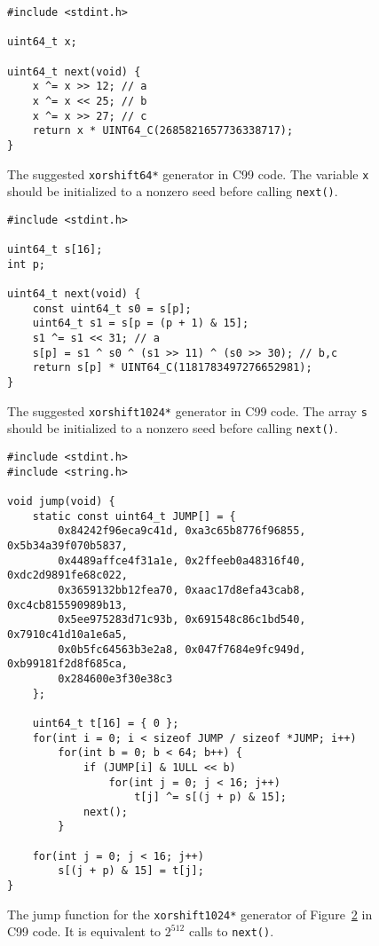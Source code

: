 \documentclass{acmsmalltr}
\newcommand{\xorshifts}[1][]{\texttt{xorshift#1*}\xspace}
\begin{document}
\begin{figure}[ht]
\centering
\begin{verbatim}
#include <stdint.h>

uint64_t x;

uint64_t next(void) {
    x ^= x >> 12; // a
    x ^= x << 25; // b
    x ^= x >> 27; // c
    return x * UINT64_C(2685821657736338717);
}
\end{verbatim}
\caption{\label{fig:code64}The suggested \xorshifts[64] generator in C99 code.
The variable \texttt{x} should be initialized to a nonzero seed before calling
\texttt{next()}.}
\end{figure}

\begin{figure}[ht]
\centering
\begin{verbatim}
#include <stdint.h>

uint64_t s[16];
int p;

uint64_t next(void) { 
    const uint64_t s0 = s[p];
    uint64_t s1 = s[p = (p + 1) & 15];
    s1 ^= s1 << 31; // a
    s[p] = s1 ^ s0 ^ (s1 >> 11) ^ (s0 >> 30); // b,c
    return s[p] * UINT64_C(1181783497276652981);
}
\end{verbatim}
\caption{\label{fig:code1024}The suggested \xorshifts[1024] generator in C99 code.
The array \texttt{s} should be initialized to a nonzero seed before calling
\texttt{next()}.}
\end{figure}

\begin{figure}[ht]
\centering
\begin{verbatim}
#include <stdint.h>
#include <string.h>

void jump(void) {
    static const uint64_t JUMP[] = {
        0x84242f96eca9c41d, 0xa3c65b8776f96855, 0x5b34a39f070b5837,
        0x4489affce4f31a1e, 0x2ffeeb0a48316f40, 0xdc2d9891fe68c022,
        0x3659132bb12fea70, 0xaac17d8efa43cab8, 0xc4cb815590989b13,
        0x5ee975283d71c93b, 0x691548c86c1bd540, 0x7910c41d10a1e6a5,
        0x0b5fc64563b3e2a8, 0x047f7684e9fc949d, 0xb99181f2d8f685ca,
        0x284600e3f30e38c3 
    };

    uint64_t t[16] = { 0 };
    for(int i = 0; i < sizeof JUMP / sizeof *JUMP; i++)
        for(int b = 0; b < 64; b++) {
            if (JUMP[i] & 1ULL << b)
                for(int j = 0; j < 16; j++)
                    t[j] ^= s[(j + p) & 15];
            next();
        }

    for(int j = 0; j < 16; j++)
        s[(j + p) & 15] = t[j];
}
\end{verbatim}
\caption{\label{fig:jump1024}The jump function for the \xorshifts[1024] generator of Figure~\ref{fig:code1024}
in C99 code. It is equivalent to $2^{512}$ calls to \texttt{next()}.}
\end{figure}
\end{document}
